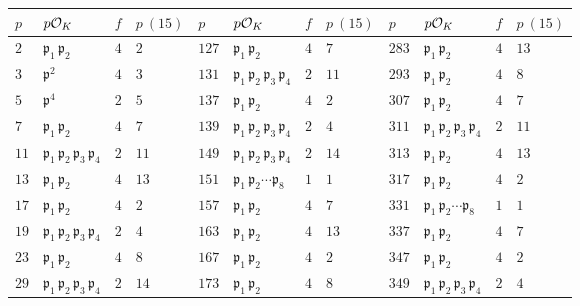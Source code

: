 \begin{figure}
  \begin{center}
    \renewcommand{\arraystretch}{1.5}
      \begin{tabular}{x{0.75cm}x{1.75cm}x{0.75cm}x{0.9cm}x{0.75cm}x{1.75cm}x{0.75cm}x{0.9cm}x{0.75cm}x{1.75cm}x{0.75cm}x{0.9cm}}
      $p$ & $p\mathcal{O}_K$ & $f$ & $p~(15)$ & $p$ & $p\mathcal{O}_K$ & $f$ & $p~(15)$ & $p$ & $p\mathcal{O}_K$ & $f$ & $p~(15)$ \tabularnewline
      \hline
      $2$ & $\mathfrak{p}_1\,\mathfrak{p}_2$ & $4$ & $2$ & $127$ & $\mathfrak{p}_1\,\mathfrak{p}_2$ & $4$ & $7$ & $283$ & $\mathfrak{p}_1\,\mathfrak{p}_2$ & $4$ & $13$ \tabularnewline
      \hline
      $3$ & $\mathfrak{p}^2$ & $4$ & $3$ & $131$ & $\mathfrak{p}_1\,\mathfrak{p}_2\,\mathfrak{p}_3\,\mathfrak{p}_4$ & $2$ & $11$ & $293$ & $\mathfrak{p}_1\,\mathfrak{p}_2$ & $4$ & $8$ \tabularnewline
      \hline
      $5$ & $\mathfrak{p}^4$ & $2$ & $5$ & $137$ & $\mathfrak{p}_1\,\mathfrak{p}_2$ & $4$ & $2$ & $307$ & $\mathfrak{p}_1\,\mathfrak{p}_2$ & $4$ & $7$ \tabularnewline
      \hline
      $7$ & $\mathfrak{p}_1\,\mathfrak{p}_2$ & $4$ & $7$ & $139$ & $\mathfrak{p}_1\,\mathfrak{p}_2\,\mathfrak{p}_3\,\mathfrak{p}_4$ & $2$ & $4$ & $311$ & $\mathfrak{p}_1\,\mathfrak{p}_2\,\mathfrak{p}_3\,\mathfrak{p}_4$ & $2$ & $11$ \tabularnewline
      \hline
      $11$ & $\mathfrak{p}_1\,\mathfrak{p}_2\,\mathfrak{p}_3\,\mathfrak{p}_4$ & $2$ & $11$ & $149$ & $\mathfrak{p}_1\,\mathfrak{p}_2\,\mathfrak{p}_3\,\mathfrak{p}_4$ & $2$ & $14$ & $313$ & $\mathfrak{p}_1\,\mathfrak{p}_2$ & $4$ & $13$ \tabularnewline
      \hline
      $13$ & $\mathfrak{p}_1\,\mathfrak{p}_2$ & $4$ & $13$ & $151$ & $\mathfrak{p}_1\,\mathfrak{p}_2\cdots\mathfrak{p}_8$ & $1$ & $1$ & $317$ & $\mathfrak{p}_1\,\mathfrak{p}_2$ & $4$ & $2$ \tabularnewline
      \hline
      $17$ & $\mathfrak{p}_1\,\mathfrak{p}_2$ & $4$ & $2$ & $157$ & $\mathfrak{p}_1\,\mathfrak{p}_2$ & $4$ & $7$ & $331$ & $\mathfrak{p}_1\,\mathfrak{p}_2\cdots\mathfrak{p}_8$ & $1$ & $1$ \tabularnewline
      \hline
      $19$ & $\mathfrak{p}_1\,\mathfrak{p}_2\,\mathfrak{p}_3\,\mathfrak{p}_4$ & $2$ & $4$ & $163$ & $\mathfrak{p}_1\,\mathfrak{p}_2$ & $4$ & $13$ & $337$ & $\mathfrak{p}_1\,\mathfrak{p}_2$ & $4$ & $7$ \tabularnewline
      \hline
      $23$ & $\mathfrak{p}_1\,\mathfrak{p}_2$ & $4$ & $8$ & $167$ & $\mathfrak{p}_1\,\mathfrak{p}_2$ & $4$ & $2$ & $347$ & $\mathfrak{p}_1\,\mathfrak{p}_2$ & $4$ & $2$ \tabularnewline
      \hline
      $29$ & $\mathfrak{p}_1\,\mathfrak{p}_2\,\mathfrak{p}_3\,\mathfrak{p}_4$ & $2$ & $14$ & $173$ & $\mathfrak{p}_1\,\mathfrak{p}_2$ & $4$ & $8$ & $349$ & $\mathfrak{p}_1\,\mathfrak{p}_2\,\mathfrak{p}_3\,\mathfrak{p}_4$ & $2$ & $4$ \tabularnewline

\end{tabular}
\end{center}
\end{figure}
